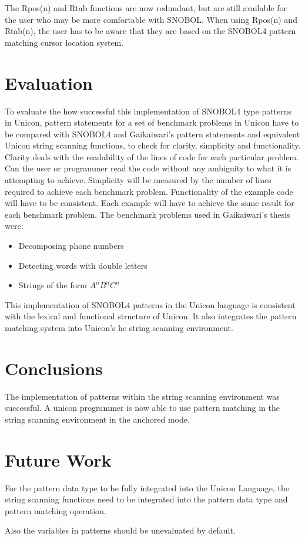 \documentclass{article}
\begin{document}
The Rpos(n) and Rtab functions are now redundant, but are still available for the user who may be more comfortable with SNOBOL.  When using Rpos(n) and Rtab(n), the user has to be aware that they are based on the SNOBOL4 pattern matching cursor location system.

\section{Evaluation}
To evaluate the how successful this implementation of SNOBOL4 type patterns in Unicon, pattern statements for a set of benchmark problems in Unicon have to be compared with SNOBOL4 and Gaikaiwari's pattern statements and equivalent Unicon string scanning functions, to check for clarity, simplicity and functionality.  Clarity deals with the readability of the lines of code for each particular problem.  Can the user or programmer read the code without any ambiguity to what it is attempting to achieve.  Simplicity will be measured by the number of lines required to achieve each benchmark problem.  Functionality of the example code will have to be consistent.  Each example will have to achieve the same result for each benchmark problem.  The benchmark problems used in Gaikaiwari's thesis were:

\begin{itemize}
\item Decomposing phone numbers
\item Detecting words with double letters
\item Strings of the form \emph{$A^nB^nC^n$}
\end{itemize}

This implementation of SNOBOL4 patterns in the Unicon language is consistent with the lexical and functional structure of Unicon.  It also integrates the pattern matching system into Unicon's he string scanning environment.

\section{Conclusions}
The implementation of patterns within the string scanning environment was successful.  A unicon programmer is now able to use pattern matching in the string scanning environment in the anchored mode.

\section{Future Work}
For the pattern data type to be fully integrated into the Unicon Language, the string scanning functions need to be integrated into the pattern data type and pattern matching operation.  

Also the variables in patterns should be unevaluated by default.

\pagebreak


\end{document}
